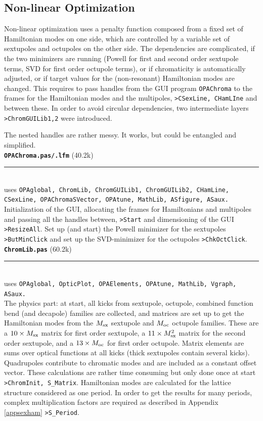 \documentclass[12pt]{article}
\newcommand\code[1]{{\tt #1}}
\newcommand{\todo}[1]{{\color{red} #1}}
\newcommand\opamodule[3]{{\bf \tt #1} #2\\  \rule[3pt]{\textwidth}{0.2pt} \\ {\scriptsize uses \tt  #3}\\[1ex]}
\begin{document}
\subsection{Non-linear Optimization}
Non-linear optimization uses a penalty function composed from a fixed set of Hamiltonian modes on one side, which are controlled by a variable set of sextupoles and octupoles on the other side.
The dependencies are complicated, if the two minimizers are running (Powell for first and second order sextupole terms, SVD for first order octupole terms), or if chromaticity is automatically adjusted, or if target values for the (non-resonant) Hamiltonian modes are changed. This requires to pass handles from the GUI program \code{OPAChroma} to the frames for the Hamiltonian modes and the multipoles, \code{>CSexLine, CHamLIne} and between these. In order to avoid circular dependencies, two intermediate layers \code{>ChromGUILib1,2} were introduced.

\todo{The nested handles are rather messy. It works, but could be entangled and simplified.}\\

\opamodule{OPAChroma.pas/.lfm}{(40.2k)}{OPAglobal, ChromLib, ChromGUILib1, ChromGUILib2, CHamLine, CSexLine, OPAChromaSVector, OPAtune, MathLib, ASfigure, ASaux.}
Initialization of the GUI, allocating the frames for Hamiltonians and multipoles and passing all the handles between, \code{>Start} and dimensioning of the GUI \code{>ResizeAll}.
Set up (and start) the Powell minimizer for the sextupoles \code{>ButMinClick} and set up the SVD-minimizer for the octupoles \code{>ChkOctClick}.\\

\opamodule{ChromLib.pas}{(60.2k)}{OPAglobal, OpticPlot, OPAElements, OPAtune,  MathLib, Vgraph, ASaux.}
The physics part: at start, all kicks from sextupole, octupole, combined function bend (and decapole) families are collected, and matrices are set up to get the Hamiltonian modes from the $M_{\rm sx}$ sextupole and $M_{\rm oc}$ octupole families. These are a $10\times  M_{\rm sx}$ matrix for first order sextupole, a $11\times  M_{\rm sx}^2$ matrix for the second order sextupole, and a  $13\times  M_{\rm oc}$ for first order octupole. Matrix elements are sums over optical functions at all kicks (thick sextupoles contain several kicks). Quadrupoles contribute to chromatic modes and are included as a constant offset vector. These calculations are rather time consuming but only done once at start \code{>ChromInit, S\_Matrix}. Hamiltonian modes are calculated for the lattice structure considered as one period. In order to get the results for many periods, complex multiplication factors are required as described in Appendix \ref{appsexham} \code{>S\_Period}.
\end{document}
